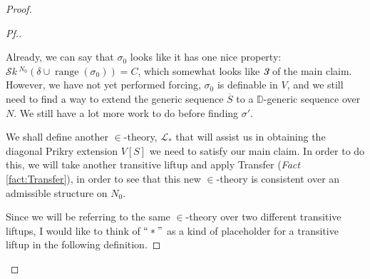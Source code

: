 \documentclass{amsart}
\theoremstyle{definition}
\theoremstyle{remark}
\newcommand{\D}{\mathbb{D}}
\renewcommand{\S}{{\overline{S}}}
\DeclareMathOperator{\ran}{range}
\newcommand{\SH}{\mathcal{S}\textit{k} \,}
\newcommand{\sk}[3]{\SH^{#1}( {#2} \cup {\ran(#3)} ) }
\begin{document}
\begin{proof}
\begin{proof}[Pf.]
\begin{center}
\end{center}

Already, we can say that $\sigma_0$ looks like it has one nice property: $\sk{N_0}{\delta}{\sigma_0}= C$, which somewhat looks like \textsl{\textbf{3}} of the main claim. However, we have not yet performed forcing, $\sigma_0$ is definable in $V$, and we still need to find a way to extend the generic sequence $\S$ to a $\D$-generic sequence over $N$. We still have a lot more work to do before finding $\sigma'$.

We shall define another $\in$-theory, $\mathcal L_*$ that will assist us in obtaining the diagonal Prikry extension $V[S]$ we need to satisfy our main claim. In order to do this, we will take another transitive liftup and apply Transfer (\textit{Fact} \ref{fact:Transfer}), in order to see that this new $\in$-theory is consistent over an admissible structure on $N_0$. 

Since we will be referring to the same $\in$-theory over two different transitive liftups, I would like to think of $``*"$ as a kind of placeholder for a transitive liftup in the following definition.


\end{proof}
\end{proof}
\end{document}
